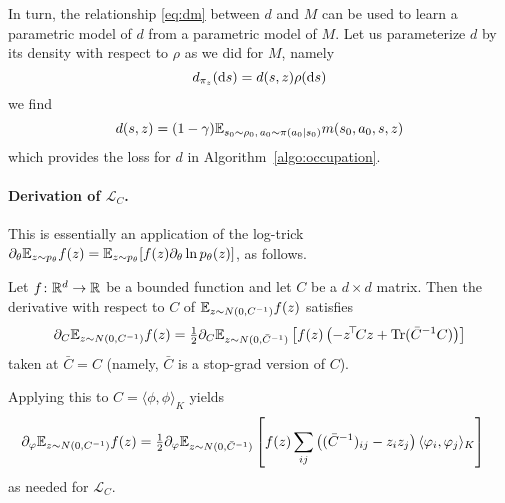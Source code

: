 \documentclass[11pt,a4paper]{article}
\newcommand{\loss}{\mathcal{L}}
\begin{document}
In turn, the relationship \eqref{eq:dm} between $d$ and $M$ can be used
to learn a parametric model of $d$ from a parametric model of $M$.
Let us parameterize  $d$ by its density with respect to $\rho$ as we did
for $M$, namely
\begin{equation}
d_{\pi_z}(\operatorname{d}\!{} s)=d(s,z)\rho(\operatorname{d}\!{} s)
\end{equation}
we find
\begin{equation}
d(s,z)=(1-\gamma) \mathbb{E}_{s_0\sim \rho_0, \, a_0\sim \pi(a_0|s_0)}
m(s_0,a_0,s,z)
\end{equation}
which provides the loss for $d$ in Algorithm~\ref{algo:occupation}.

\paragraph{Derivation of $\loss_C$.} This is essentially an application
of the log-trick $\partial_\theta \mathbb{E}_{z\sim p_\theta} f(z)=\mathbb{E}_{z\sim
p_\theta} [f(z)\partial_\theta \ln p_\theta(z)]$, as follows.

\begin{lem}
\label{lem:gradexpN}
Let $f\colon {\mathbb{R}}^d\to {\mathbb{R}}$ be a bounded function and let $C$ be a $d\times
d$ matrix. Then the derivative with respect to $C$ of $\mathbb{E}_{z\sim
N(0,C^{-1})} f(z)$ satisfies
\begin{align}
\partial_C \mathbb{E}_{z\sim N(0,C^{-1})} f(z)=\tfrac12 \partial_C \mathbb{E}_{z\sim N(0,\bar C^{-1})}
\left[
f(z) \left(
-z^{\!\top}\!Cz+\operatorname{Tr}(\bar C^{-1}C)
\right)
\right]
\end{align}
taken at $\bar C=C$ (namely, $\bar C$ is a stop-grad version of $C$).
\end{lem}

Applying this to $C=\langle\phi,\phi\rangle_K$ yields
\begin{align}
\partial_\varphi \mathbb{E}_{z\sim N(0,C^{-1})} f(z)&=
\tfrac12
\partial_\varphi \mathbb{E}_{z\sim N(0,\bar C^{-1})}
\left[
f(z) 
\sum_{ij} \left((\bar C^{-1})_{ij}-z_iz_j\right)\langle
\varphi_i,\varphi_j\rangle_K
\right]
\end{align}
as needed for $\loss_C$.
\end{document}
